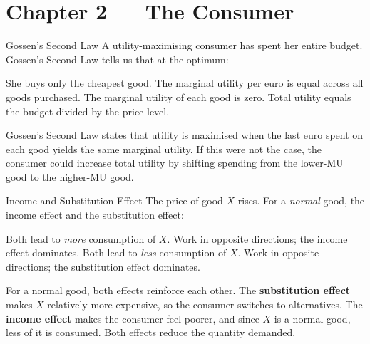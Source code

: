 \documentclass[paper=a5]{scrartcl}
\begin{document}
\section{Chapter 2 — The Consumer}

\begin{question}[type=mc]{Gossen's Second Law}
A utility-maximising consumer has spent her entire budget. Gossen's Second Law
tells us that at the optimum:
\begin{choices}
  \choice        She buys only the cheapest good.
  \correctchoice The marginal utility per euro is equal across all goods purchased.
  \choice        The marginal utility of each good is zero.
  \choice        Total utility equals the budget divided by the price level.
\end{choices}
\begin{solution}
  Gossen's Second Law states that utility is maximised when the last euro
  spent on each good yields the same marginal utility. If this were not the
  case, the consumer could increase total utility by shifting spending from the
  lower-MU good to the higher-MU good.
\end{solution}
\end{question}

\begin{question}[type=mc]{Income and Substitution Effect}
The price of good $X$ rises. For a \emph{normal} good, the income effect and
the substitution effect:
\begin{choices}
  \choice        Both lead to \emph{more} consumption of $X$.
  \choice        Work in opposite directions; the income effect dominates.
  \correctchoice Both lead to \emph{less} consumption of $X$.
  \choice        Work in opposite directions; the substitution effect dominates.
\end{choices}
\begin{solution}
  For a normal good, both effects reinforce each other. The \textbf{substitution
  effect} makes $X$ relatively more expensive, so the consumer switches to
  alternatives. The \textbf{income effect} makes the consumer feel poorer, and
  since $X$ is a normal good, less of it is consumed. Both effects reduce
  the quantity demanded.
\end{solution}
\end{question}
\end{document}
